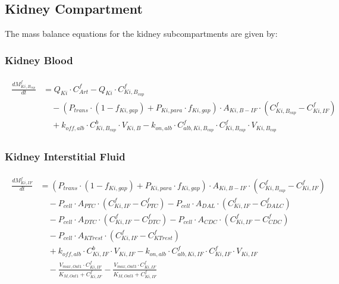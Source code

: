 \documentclass[preprint,12pt,authoryear]{elsarticle}
\begin{document}
\subsection{Kidney Compartment}

The mass balance equations for the kidney subcompartments are given by:

\subsubsection{Kidney Blood}

\begin{align}
\begin{aligned}
\frac{dM_{Ki,B_{cap}}^f}{dt} &= Q_{Ki} \cdot C_{Art}^f 
- Q_{Ki} \cdot C_{Ki,B_{cap}}^f \\
& \quad - (P_{trans}\cdot  (1-f_{Ki,gap}) + P_{Ki,para} \cdot f_{Ki,gap}) \cdot A_{Ki,B-IF} \cdot (C_{Ki,B_{cap}}^f - C_{Ki,IF}^f) \\
& \quad + k_{off,alb} \cdot C_{Ki,B_{cap}}^b \cdot V_{Ki,B}
- k_{on,alb} \cdot C_{alb,Ki,B_{cap}}^f \cdot C_{Ki,B_{cap}}^f \cdot V_{Ki,B_{cap}}
\end{aligned}
\label{eq:PFOA_kidney_blood}
\end{align}

\subsubsection{Kidney Interstitial Fluid}

\begin{align}
\begin{aligned}
\frac{dM_{Ki,IF}^f}{dt} &= (P_{trans}\cdot  (1-f_{Ki,gap}) + P_{Ki,para} \cdot f_{Ki,gap}) \cdot A_{Ki,B-IF} \cdot (C_{Ki,B_{cap}}^f - C_{Ki,IF}^f) \\
& \quad - P_{cell} \cdot A_{PTC} \cdot (C_{Ki,IF}^f - C_{PTC}^f)
- P_{cell} \cdot A_{DAL} \cdot (C_{Ki,IF}^f - C_{DALC}^f) \\
& \quad -  P_{cell} \cdot A_{DTC} \cdot (C_{Ki,IF}^f - C_{DTC}^f)
-  P_{cell} \cdot A_{CDC} \cdot (C_{Ki,IF}^f - C_{CDC}^f)\\
& \quad -  P_{cell} \cdot A_{KTrest} \cdot (C_{Ki,IF}^f - C_{KTrest}^f) \\
& \quad + k_{off,alb} \cdot C_{Ki,IF}^b \cdot V_{Ki,IF}
- k_{on,alb} \cdot C_{alb,Ki,IF}^f \cdot C_{Ki,IF}^f \cdot V_{Ki,IF} \\
& \quad - \frac{V_{max,Oat1} \cdot C_{Ki,IF}^f}{K_{M,Oat1} + C_{Ki,IF}^f}
- \frac{V_{max,Oat3} \cdot C_{Ki,IF}^f}{K_{M,Oat3} + C_{Ki,IF}^f}
\end{aligned}
\label{eq:PFOA_kidney_interstitial}
\end{align}
\end{document}
